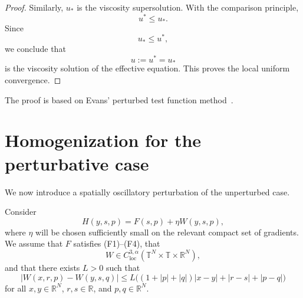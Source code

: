 \documentclass[preprint]{elsarticle}
\numberwithin{equation}{section}
\begin{document}
\begin{proof}
Similarly, $u_*$ is the viscosity supersolution. With the comparison principle,
$$
u^*\le u_*.
$$
Since
$$
u_*\le u^*,
$$
we conclude that
$$
u:=u^*=u_*
$$
is the viscosity solution of the effective equation. This proves the local uniform convergence.
\end{proof}
The proof is based on Evans' perturbed test function method~\cite{Evans1989}.


\section{Homogenization for the perturbative case}

We now introduce a spatially oscillatory perturbation of the unperturbed case.

Consider
\begin{equation}
H(y,s,p)=F(s,p)+\eta W(y,s,p),
\end{equation}
where $\eta$ will be chosen sufficiently small on the relevant compact set of gradients. We assume that $F$ satisfies \textnormal{(F1)}--\textnormal{(F4)},
that
\[
W\in C_{\mathrm{loc}}^{3,\alpha}
(\mathbb T^N\times\mathbb T\times\mathbb R^N),
\]
and that there exists $L>0$ such that
\[
|W(x,r,p)-W(y,s,q)|
\le L\big((1+|p|+|q|)|x-y|+|r-s|+|p-q|\big)
\]
for all $x,y\in\mathbb R^N$, $r,s\in\mathbb R$, and $p,q\in\mathbb R^N$.
\end{document}
